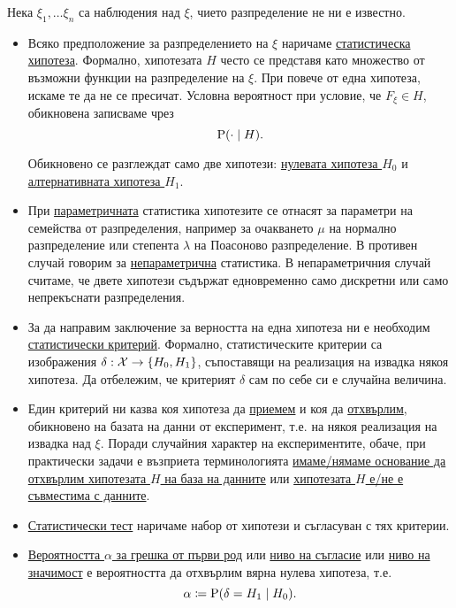 \documentclass[numbers=endperiod, DIV=15, bibliography=totocnumbered]{scrartcl}
\begin{document}
\begin{definition}[Хипотези]
  Нека $\xi_1, \ldots \xi_n$ са наблюдения над $\xi$, чието разпределение не ни е известно.

  \begin{itemize}
    \item Всяко предположение за разпределението на $\xi$ наричаме \uline{статистическа хипотеза}. Формално, хипотезата $H$ често се представя като множество от възможни функции на разпределение на $\xi$. При повече от една хипотеза, искаме те да не се пресичат. Условна вероятност при условие, че $F_\xi \in H$, обикновена записваме чрез
    \begin{displaymath}
      \operatorname{P}(\cdot \mid H).
    \end{displaymath}

    Обикновено се разглеждат само две хипотези: \uline{нулевата хипотеза $H_0$} и \uline{алтернативната хипотеза $H_1$}.

    \item При \uline{параметричната} статистика хипотезите се отнасят за параметри на семейства от разпределения, например за очакването $\mu$ на нормално разпределение или степента $\lambda$ на Поасоново разпределение. В противен случай говорим за \uline{непараметрична} статистика. В непараметричния случай считаме, че двете хипотези съдържат едновременно само дискретни или само непрекъснати разпределения.

    \item За да направим заключение за верността на една хипотеза ни е необходим \uline{статистически критерий}. Формално, статистическите критерии са изображения $\delta: \mathcal{X} \to \{ H_0, H_1 \}$, съпоставящи на реализация на извадка някоя хипотеза. Да отбележим, че критерият $\delta$ сам по себе си е случайна величина.

    \item Един критерий ни казва коя хипотеза да \uline{приемем} и коя да \uline{отхвърлим}, обикновено на базата на данни от експеримент, т.е. на някоя реализация на извадка над $\xi$. Поради случайния характер на експериментите, обаче, при практически задачи е възприета терминологията \uline{имаме/нямаме основание да отхвърлим хипотезата $H$ на база на данните} или \uline{хипотезата $H$ е/не е съвместима с данните}.

    \item \uline{Статистически тест} наричаме набор от хипотези и съгласуван с тях критерии.

    \item \uline{Вероятността $\alpha$ за грешка от първи род} или \uline{ниво на съгласие} или \uline{ниво на значимост} е вероятността да отхвърлим вярна нулева хипотеза, т.е.
    \begin{displaymath}
      \alpha \coloneqq \operatorname{P}(\delta = H_1 \mid H_0).
    \end{displaymath}


\end{itemize}
\end{definition}
\end{document}
